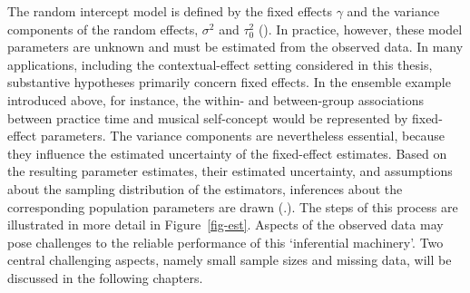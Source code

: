 \documentclass[
  letterpaper,
  11pt,
  english,
  singlespacing,
  headsepline,
  openany]{MastersDoctoralThesis}
\begin{document}
The random intercept model is defined by the fixed effects \(\gamma\)
and the variance components of the random effects, \(\sigma^2\) and
\(\tau_0^2\) ().
In practice, however, these model parameters are unknown and must be
estimated from the observed data. In many applications, including the
contextual-effect setting considered in this thesis, substantive
hypotheses primarily concern fixed effects. In the ensemble example
introduced above, for instance, the within- and between-group
associations between practice time and musical self-concept would be
represented by fixed-effect parameters. The variance components are
nevertheless essential, because they influence the estimated uncertainty
of the fixed-effect estimates. Based on the resulting parameter
estimates, their estimated uncertainty, and assumptions about the
sampling distribution of the estimators, inferences about the
corresponding population parameters are drawn
(.). The
steps of this process are illustrated in more detail in
Figure~\ref{fig-est}. Aspects of the observed data may pose challenges
to the reliable performance of this `inferential machinery'. Two central
challenging aspects, namely small sample sizes and missing data, will be
discussed in the following chapters.
\end{document}
